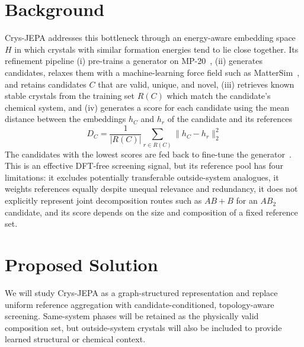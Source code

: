 \documentclass[10pt,a4paper]{article}
\newcommand{\sectionrule}{\vspace{-1.5pt}{\color{navy!35}\hrule height .35pt}\vspace{1.2pt}}
\begin{document}
\section*{Background}
\sectionrule
Crys-JEPA addresses this bottleneck through an energy-aware embedding space $H$ in which crystals with similar formation energies tend to lie close together. Its refinement pipeline (i) pre-trains a generator on MP-20~\cite{xie2022cdvae}, (ii) generates candidates, relaxes them with a machine-learning force field such as MatterSim~\cite{yang2024mattersim}, and retains candidates $C$ that are valid, unique, and novel, (iii) retrieves known stable crystals from the training set $R(C)$ which match the candidate's chemical system, and (iv) generates a score for each candidate using the mean distance between the embeddings $h_C$ and $h_r$ of the candidate and its references 
\[
  D_C = \frac{1}{|R(C)|} \sum_{r \in R(C)} \lVert h_C-h_r \rVert_2^2
\]
The candidates with the lowest scores are fed back to fine-tune the generator~\cite{liu2026crysjepa}. This is an effective DFT-free screening signal, but its reference pool has four limitations: it excludes potentially transferable outside-system analogues, it weights references equally despite unequal relevance and redundancy, it does not explicitly represent joint decomposition routes such as $AB+B$ for an $AB_2$ candidate, and its score depends on the size and composition of a fixed reference set.

\section*{Proposed Solution}
\sectionrule
We will study Crys-JEPA as a graph-structured representation and replace uniform reference aggregation with candidate-conditioned, topology-aware screening. Same-system phases will be retained as the physically
valid composition set, but outside-system crystals will also be included to provide learned structural or chemical context.
\end{document}
